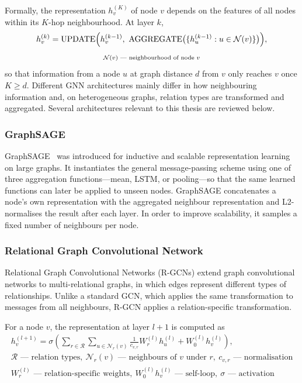 Formally, the representation $h_v^{(K)}$ of node $v$ depends on the features
of all nodes within its $K$-hop neighbourhood.
At layer $k$,
\begin{equation}
\label{eq:related-mp}
\begin{gathered}
h_v^{(k)} = \text{UPDATE}\Bigl(h_v^{(k-1)},\ \text{AGGREGATE}\bigl(\{h_u^{(k-1)} : u \in \mathcal{N}(v)\}\bigr)\Bigr), \\[0.3em]
{\scriptstyle
\mathcal{N}(v) \text{ --- neighbourhood of node } v
}
\end{gathered}
\end{equation}
so that information from a node $u$ at graph distance $d$ from $v$ only
reaches $v$ once $K \geq d$.
Different GNN architectures mainly differ in how neighbouring information
and, on heterogeneous graphs, relation types are transformed and aggregated.
Several architectures relevant to this thesis are reviewed below.

\subsubsection{GraphSAGE}

GraphSAGE~\cite{hamilton2017graphsage} was introduced for inductive and
scalable representation learning on large graphs.
It instantiates the general message-passing scheme using one of three
aggregation functions---mean, LSTM, or pooling---so that the same learned
functions can later be applied to unseen nodes.
GraphSAGE concatenates a node's own representation with the aggregated
neighbour representation and L2-normalises the result after each layer.
In order to improve scalability, it samples a fixed number of neighbours per node.

\subsubsection{Relational Graph Convolutional Network}

Relational Graph Convolutional Networks (R-GCNs)
\cite{schlichtkrull2018rgcn} extend graph convolutional networks to
multi-relational graphs, in which edges represent different types of
relationships.
Unlike a standard GCN, which applies the same transformation to messages
from all neighbours, R-GCN applies a relation-specific transformation.

For a node $v$, the representation at layer $l+1$ is computed as
\begin{equation}
\label{eq:rgcn}
\begin{gathered}
h_v^{(l+1)} =
\sigma \left(
\sum_{r \in \mathcal{R}}
\sum_{u \in \mathcal{N}_r(v)}
\frac{1}{c_{v,r}}
W_r^{(l)} h_u^{(l)}
+
W_0^{(l)} h_v^{(l)}
\right), \\[0.4em]
{\scriptstyle
\mathcal{R}\text{ --- relation types},\ 
\mathcal{N}_r(v)\text{ --- neighbours of }v\text{ under }r,\ 
c_{v,r}\text{ --- normalisation}
} \\[0.15em]
{\scriptstyle
W_r^{(l)}\text{ --- relation-specific weights},\ 
W_0^{(l)}h_v^{(l)}\text{ --- self-loop},\ 
\sigma\text{ --- activation}
}
\end{gathered}
\end{equation}

